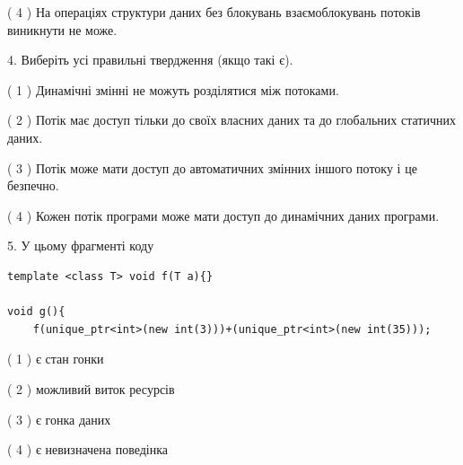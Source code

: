 \documentclass[12pt, ukrainian]{article}
\begin{document}
\begin {large}
{( 4 ) На операціях структури даних без блокувань взаємоблокувань потоків виникнути не може.%


4. Виберіть усі правильні твердження (якщо такі є).\par
\vspace{2mm}

( 1 ) Динамічні змінні не можуть розділятися між потоками.%

( 2 ) Потік має доступ тільки до своїх власних даних та до глобальних статичних даних.%

( 3 ) Потік може мати доступ до автоматичних змінних іншого потоку і це безпечно.%

( 4 ) Кожен потік програми може мати доступ до динамічних даних програми.%


5. У цьому фрагменті коду
\begin{verbatim}
template <class T> void f(T a){}

void g(){
    f(unique_ptr<int>(new int(3)))+(unique_ptr<int>(new int(35)));
\end{verbatim}

( 1 ) є стан гонки%

( 2 ) можливий виток ресурсів%

( 3 ) є гонка даних%

( 4 ) є невизначена поведінка%
}
\end {large}
\end{document}
